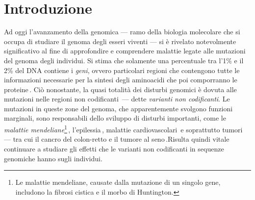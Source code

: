 
\chapter{Introduzione}\label{chp:introduction}

Ad oggi l'avanzamento della genomica — ramo della biologia molecolare che si occupa di studiare il genoma degli esseri viventi — si è rivelato notevolmente significativo al fine di approfondire e comprendere malattie legate alle mutazioni del genoma degli individui. Si stima che solamente una percentuale tra l'1\% e il 2\% del DNA contiene i \textsl{geni}, ovvero particolari regioni che contengono tutte le informazioni necessarie per la sintesi degli aminoacidi che poi comporranno le proteine\,\cite{sahu2011identification, pollard2022cell}. Ciò nonostante, la quasi totalità dei disturbi genomici è dovuta alle mutazioni nelle regioni non codificanti\,\cite{zhang2015non} — dette \textsl{varianti non codificanti}. Le mutazioni in queste zone del genoma, che apparentemente svolgono funzioni marginali, sono responsabili dello sviluppo di disturbi importanti, come le \textsl{malattie mendeliane}\footnote{Le malattie mendeliane, causate dalla mutazione di un singolo gene, includono la fibrosi cistica e il morbo di Huntington.}\,\cite{french2020role, chial2008mendelian}, l'epilessia\,\cite{pagni2022non}, malattie cardiovascolari\,\cite{kapoor2014enhancer, zhang2015non} e soprattutto tumori — tra cui il cancro del colon-retto e il tumore al seno\,\cite{khurana2016role, tian2019systematic, bojesen2013multiple, michailidou2017association}.Risulta quindi vitale continuare a studiare gli effetti che le varianti non codificanti in sequenze genomiche hanno sugli individui.

